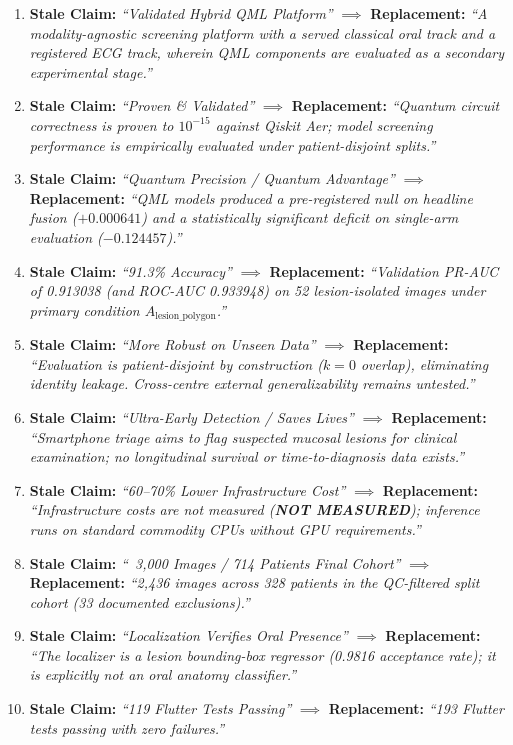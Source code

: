 \documentclass[11pt,a4paper]{report}
\newcommand{\notmeasured}{\textcolor{csred}{\textbf{NOT MEASURED}}}
\begin{document}
\begin{enumerate}[leftmargin=*]
  \item \textbf{Stale Claim:} \textit{``Validated Hybrid QML Platform''} $\implies$ \textbf{Replacement:} \textit{``A modality-agnostic screening platform with a served classical oral track and a registered ECG track, wherein QML components are evaluated as a secondary experimental stage.''}
  \item \textbf{Stale Claim:} \textit{``Proven \& Validated''} $\implies$ \textbf{Replacement:} \textit{``Quantum circuit correctness is proven to $10^{-15}$ against Qiskit Aer; model screening performance is empirically evaluated under patient-disjoint splits.''}
  \item \textbf{Stale Claim:} \textit{``Quantum Precision / Quantum Advantage''} $\implies$ \textbf{Replacement:} \textit{``QML models produced a pre-registered null on headline fusion ($+0.000641$) and a statistically significant deficit on single-arm evaluation ($-0.124457$).''}
  \item \textbf{Stale Claim:} \textit{``91.3\% Accuracy''} $\implies$ \textbf{Replacement:} \textit{``Validation PR-AUC of 0.913038 (and ROC-AUC 0.933948) on 52 lesion-isolated images under primary condition $A_\text{lesion\_polygon}$.''}
  \item \textbf{Stale Claim:} \textit{``More Robust on Unseen Data''} $\implies$ \textbf{Replacement:} \textit{``Evaluation is patient-disjoint by construction ($k=0$ overlap), eliminating identity leakage. Cross-centre external generalizability remains untested.''}
  \item \textbf{Stale Claim:} \textit{``Ultra-Early Detection / Saves Lives''} $\implies$ \textbf{Replacement:} \textit{``Smartphone triage aims to flag suspected mucosal lesions for clinical examination; no longitudinal survival or time-to-diagnosis data exists.''}
  \item \textbf{Stale Claim:} \textit{``60--70\% Lower Infrastructure Cost''} $\implies$ \textbf{Replacement:} \textit{``Infrastructure costs are not measured (\notmeasured); inference runs on standard commodity CPUs without GPU requirements.''}
  \item \textbf{Stale Claim:} \textit{``~3,000 Images / 714 Patients Final Cohort''} $\implies$ \textbf{Replacement:} \textit{``2,436 images across 328 patients in the QC-filtered split cohort (33 documented exclusions).''}
  \item \textbf{Stale Claim:} \textit{``Localization Verifies Oral Presence''} $\implies$ \textbf{Replacement:} \textit{``The localizer is a lesion bounding-box regressor (0.9816 acceptance rate); it is explicitly not an oral anatomy classifier.''}
  \item \textbf{Stale Claim:} \textit{``119 Flutter Tests Passing''} $\implies$ \textbf{Replacement:} \textit{``193 Flutter tests passing with zero failures.''}
\end{enumerate}
\end{document}

